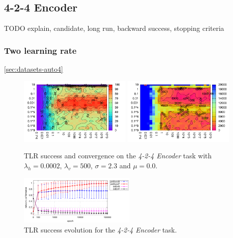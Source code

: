 \subsection{4-2-4 Encoder} 
TODO explain, candidate, long run, backward success, stopping criteria 

\subsubsection{Two learning rate} 
\label{sec:tlr-auto4} 
\ref{sec:datasets-auto4} 
\begin{figure}[H]
  \centering
  \includegraphics[width=0.48\textwidth]{img/tlr-auto4-success.pdf}   
  \includegraphics[width=0.48\textwidth]{img/tlr-auto4-epoch.pdf}     
  \caption{TLR success and convergence on the \emph{4-2-4 Encoder} task with $\lambda_h=0.0002$, $\lambda_v=500$, $\sigma = 2.3$ and $\mu = 0.0$.}
  \label{fig:results-tlr-auto4-performance}
\end{figure}

\begin{figure}[H]
  \centering
  \includegraphics[width=0.5\textwidth]{img/tlr-best-perf.pdf}      
  \caption{TLR success evolution for the \emph{4-2-4 Encoder} task.}
  \label{fig:results-tlr-auto4-epoch} 
\end{figure}

